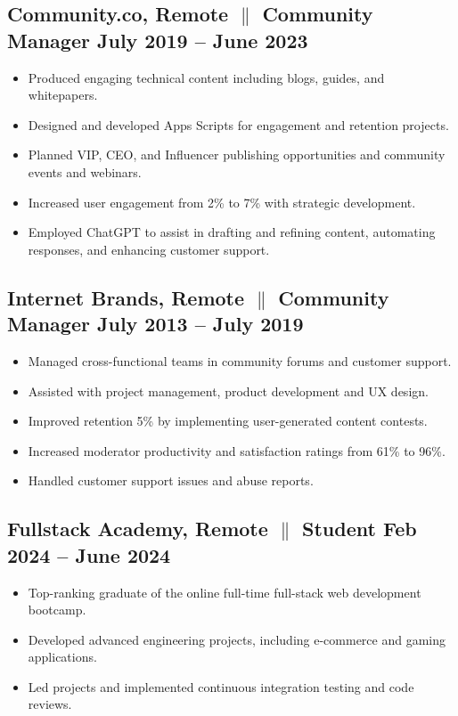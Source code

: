 \documentclass[a4paper,9pt]{article}
\begin{document}
\subsection{Community.co, Remote {$\parallel$}{ Community Manager} \hfill
      \textbf{July 2019 – June
            2023}}
\begin{itemize}
      \item Produced engaging technical content including blogs, guides, and whitepapers.
      \item Designed and developed Apps Scripts for engagement and retention
            projects.
      \item Planned VIP, CEO, and Influencer publishing opportunities and community
            events and webinars.
      \item Increased user engagement from 2\% to 7\% with
            strategic
            development.
      \item Employed ChatGPT to assist in drafting and refining content, automating responses, and enhancing customer support.
\end{itemize}

\subsection{Internet Brands, Remote {$\parallel$}{ Community Manager} \hfill
      \textbf{July 2013 – July
            2019}}
\begin{itemize}
      \item Managed cross-functional teams in community forums and customer
            support.
      \item Assisted with project management, product development and UX design.
      \item Improved retention 5\% by implementing user-generated content contests.
      \item Increased moderator productivity and satisfaction ratings from 61\%
            to
            96\%.
      \item Handled customer support issues and abuse reports.
\end{itemize}

\subsection{Fullstack Academy, Remote {$\parallel$}{ Student} \hfill
      \textbf{Feb
            2024 – June
            2024}}
\begin{itemize}
      \item Top-ranking graduate of the online full-time full-stack web
            development
            bootcamp.
      \item Developed advanced engineering projects, including e-commerce and gaming applications.
      \item Led projects and implemented continuous integration testing and code reviews.
\end{itemize}
\end{document}
